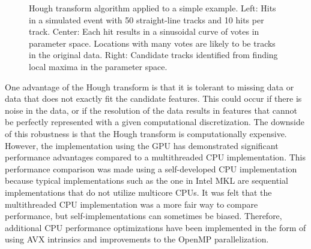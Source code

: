 \documentclass{JINST}
\begin{document}
\begin{figure}[!Hhtb]
\begin{center}
  \caption{Hough transform algorithm applied to a simple example. Left: Hits in a simulated event with 50
    straight-line tracks and 10 hits per track. Center: Each hit results in a sinusoidal curve of votes in parameter
    space. Locations with many votes are likely to be tracks in the original data. Right:
    Candidate tracks identified from finding local maxima in the parameter space.\label{fig:hough}}
\end{center}
\end{figure}

One advantage of the Hough transform is that it is tolerant to missing data or data that does not exactly fit the candidate features.  This could occur if there is noise in the data, or if the resolution of the data results in features that cannot be perfectly represented with a given computational discretization.  The downside of this robustness is that the Hough transform is computationally expensive.  However, the implementation using the GPU has demonstrated significant performance advantages compared to a multithreaded CPU implementation.  This performance comparison was made using a self-developed CPU implementation because typical implementations such as the one in Intel MKL are sequential implementations that do not utilize multicore CPUs.  It was felt that the multithreaded CPU implementation was a more fair way to compare performance, but self-implementations can sometimes be biased.  Therefore, additional CPU performance optimizations have been implemented in the form of using AVX intrinsics and improvements to the OpenMP parallelization.
\end{document}
